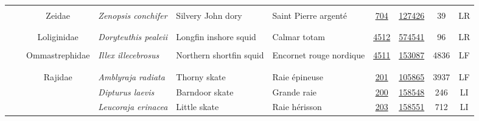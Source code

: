 \documentclass[12pt]{article}\usepackage[]{graphicx}\usepackage[]{color}
\begin{document}
\begin{landscapepage}
\begin{longtable}[t]{ccc>{\centering\arraybackslash}p{3cm}>{\centering\arraybackslash}p{3cm}>{\centering\arraybackslash}p{3cm}>{}c>{}ccc}
\addlinespace[0.3em]
\\
\hspace{1em}\hspace{1em} &  & Zeidae & \em{Zenopsis conchifer} & Silvery John dory & Saint Pierre argenté & \href{#sec:704}{704} & \href{http://www.marinespecies.org/aphia.php?p=taxdetails&id=127426}{127426} & 39 & LR\\
\addlinespace[0.3em]
\\
\addlinespace[0.3em]
\\
\hspace{1em}\hspace{1em} &  & Loliginidae & \em{Doryteuthis pealeii} & Longfin inshore squid & Calmar totam & \href{#sec:4512}{4512} & \href{http://www.marinespecies.org/aphia.php?p=taxdetails&id=574541}{574541} & 96 & LR\\
\addlinespace[0.3em]
\\
\hspace{1em}\hspace{1em} &  & Ommastrephidae & \em{Illex illecebrosus} & Northern shortfin squid & Encornet rouge nordique & \href{#sec:4511}{4511} & \href{http://www.marinespecies.org/aphia.php?p=taxdetails&id=153087}{153087} & 4836 & LF\\
\addlinespace[0.3em]
\\
\addlinespace[0.3em]
\\
\hspace{1em}\hspace{1em} &  & Rajidae & \em{Amblyraja radiata} & Thorny skate & Raie épineuse & \href{#sec:201}{201} & \href{http://www.marinespecies.org/aphia.php?p=taxdetails&id=105865}{105865} & 3937 & LF\\
\hspace{1em}\hspace{1em} &  &  & \em{Dipturus laevis} & Barndoor skate & Grande raie & \href{#sec:200}{200} & \href{http://www.marinespecies.org/aphia.php?p=taxdetails&id=158548}{158548} & 246 & LI\\
\hspace{1em}\hspace{1em} &  &  & \em{Leucoraja erinacea} & Little skate & Raie hérisson & \href{#sec:203}{203} & \href{http://www.marinespecies.org/aphia.php?p=taxdetails&id=158551}{158551} & 712 & LI\\

\end{longtable}
\end{landscapepage}
\end{document}

